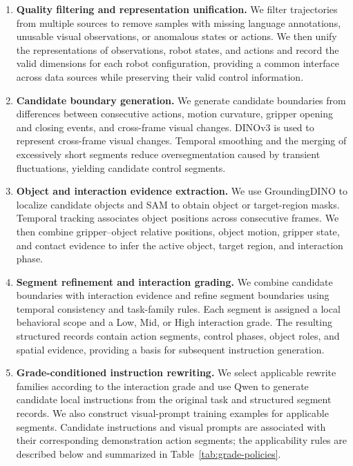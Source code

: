 \begin{enumerate}
\setlength{\itemsep}{0pt}
\setlength{\parsep}{0pt}
\item \textbf{Quality filtering and representation unification.} We filter trajectories from multiple
sources to remove samples with missing language annotations, unusable visual observations, or
anomalous states or actions. We then unify the representations of observations, robot states, and
actions and record the valid dimensions for each robot configuration, providing a common interface
across data sources while preserving their valid control information.

\item \textbf{Candidate boundary generation.} We generate candidate boundaries from differences
between consecutive actions, motion curvature, gripper opening and closing events, and cross-frame
visual changes. DINOv3 is used to represent cross-frame visual changes. Temporal smoothing and the
merging of excessively short segments reduce oversegmentation caused by transient fluctuations,
yielding candidate control segments.

\item \textbf{Object and interaction evidence extraction.} We use GroundingDINO to localize
candidate objects and SAM to obtain object or target-region masks. Temporal tracking associates
object positions across consecutive frames. We then combine gripper--object relative positions,
object motion, gripper state, and contact evidence to infer the active object, target region, and
interaction phase.

\item \textbf{Segment refinement and interaction grading.} We combine candidate boundaries with
interaction evidence and refine segment boundaries using temporal consistency and task-family
rules. Each segment is assigned a local behavioral scope and a Low, Mid, or High interaction grade.
The resulting structured records contain action segments, control phases, object roles, and spatial
evidence, providing a basis for subsequent instruction generation.

\item \textbf{Grade-conditioned instruction rewriting.} We select applicable rewrite families
according to the interaction grade and use Qwen to generate candidate local instructions from the
original task and structured segment records. We also construct visual-prompt training examples for
applicable segments. Candidate instructions and visual prompts are associated with their
corresponding demonstration action segments; the applicability rules are described below and
summarized in Table~\ref{tab:grade-policies}.


\end{enumerate}
